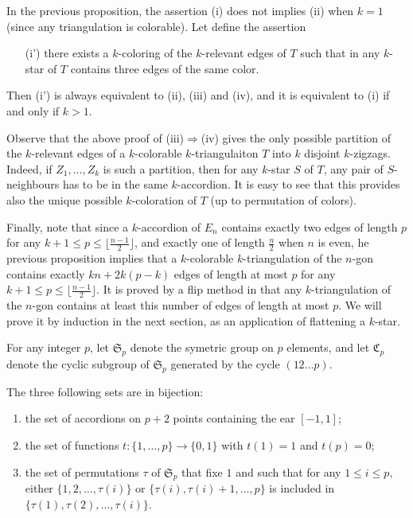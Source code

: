 \documentclass[12pt]{amsart}
\begin{document}
In the previous proposition, the assertion (i) does not implies (ii) when $k=1$ (since any triangulation is colorable). Let define the assertion
\begin{itemize}
\item[(i')] there exists a $k$-coloring of the $k$-relevant edges of $T$ such that in any $k$-star of $T$ contains three edges of the same color.
\end{itemize}
Then (i') is always equivalent to (ii), (iii) and (iv), and it is equivalent to (i) if and only if $k>1$.


Observe that the above proof of (iii)$\Rightarrow$(iv) gives the only possible partition of the $k$-relevant edges of a $k$-colorable $k$-triangulaiton $T$ into $k$ disjoint $k$-zigzags. Indeed, if $Z_1,\ldots,Z_k$ is such a partition, then for any $k$-star $S$ of $T$, any pair of $S$-neighbours has to be in the same $k$-accordion. 
It is easy to see that this provides also the unique possible $k$-coloration of $T$ (up to permutation of colors).


Finally, note that since a $k$-accordion of $E_n$ contains exactly two edges of length $p$ for any $k+1\le p\le \lfloor\frac{n-1}{2}\rfloor$, and exactly one of length $\frac{n}{2}$ when $n$ is even, he previous proposition implies that a $k$-colorable $k$-triangulation of the $n$-gon contains exactly $kn+2k(p-k)$ edges of length at most $p$ for any $k+1\le p\le \lfloor\frac{n-1}{2}\rfloor$. It is proved by a flip method in \cite{n-gdfcp-00} that any $k$-triangulation of the $n$-gon contains at least this number of edges of length at most $p$. We will prove it by induction in the next section, as an application of flattening a $k$-star.

\medskip

For any integer $p$, let $\mathfrak{S}_p$ denote the symetric group on $p$ elements, and let $\mathfrak{C}_p$ denote the cyclic subgroup of $\mathfrak{S}_p$ generated by the cycle $(12\ldots p)$. 

\begin{lemma}
The three following sets are in bijection:
\begin{enumerate}
\item the set of accordions on $p+2$ points containing the ear $[-1,1]$;
\item the set of functions $t:\{1,\ldots,p\}\to\{0,1\}$ with $t(1)=1$ and $t(p)=0$;
\item the set of permutations $\tau$ of $\mathfrak{S}_p$ that fixe $1$ and such that for any $1\le i\le p$, either $\{1,2,\ldots,\tau(i)\}$ or $\{\tau(i),\tau(i)+1,\ldots,p\}$ is included in $\{\tau(1),\tau(2),\ldots,\tau(i)\}$.
\end{enumerate}
\end{lemma}
\end{document}
